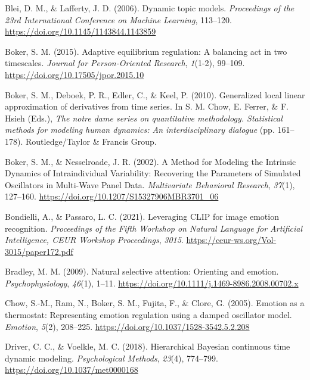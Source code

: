 \documentclass[
]{article}
\newlength{\cslhangindent}
\newenvironment{CSLReferences}[2] %
 {\begin{list}{}{%
  \setlength{\itemindent}{0pt}
  \setlength{\leftmargin}{0pt}
  \setlength{\parsep}{0pt}
  \ifodd #1
   \setlength{\leftmargin}{\cslhangindent}
   \setlength{\itemindent}{-1\cslhangindent}
  \fi
  \setlength{\itemsep}{#2\baselineskip}}}
 {\end{list}}
\begin{document}
\label{refs}
\begin{CSLReferences}{1}{0}
Blei, D. M., \& Lafferty, J. D. (2006). Dynamic topic models.
\emph{Proceedings of the 23rd International Conference on Machine
Learning}, 113--120. \url{https://doi.org/10.1145/1143844.1143859}

Boker, S. M. (2015). Adaptive equilibrium regulation: {A} balancing act
in two timescales. \emph{Journal for Person-Oriented Research},
\emph{1}(1-2), 99--109. \url{https://doi.org/10.17505/jpor.2015.10}

Boker, S. M., Deboek, P. R., Edler, C., \& Keel, P. (2010). Generalized
local linear approximation of derivatives from time series. In S. M.
Chow, E. Ferrer, \& F. Hsieh (Eds.), \emph{The notre dame series on
quantitative methodology. Statistical methods for modeling human
dynamics: An interdisciplinary dialogue} (pp. 161--178).
Routledge/Taylor \& Francis Group.

Boker, S. M., \& Nesselroade, J. R. (2002). A {Method} for {Modeling}
the {Intrinsic Dynamics} of {Intraindividual Variability}: {Recovering}
the {Parameters} of {Simulated Oscillators} in {Multi-Wave Panel Data}.
\emph{Multivariate Behavioral Research}, \emph{37}(1), 127--160.
\url{https://doi.org/10.1207/S15327906MBR3701_06}

Bondielli, A., \& Passaro, L. C. (2021). Leveraging {CLIP} for image
emotion recognition. \emph{Proceedings of the Fifth Workshop on Natural
Language for Artificial Intelligence, CEUR Workshop Proceedings},
\emph{3015}. \url{https://ceur-ws.org/Vol-3015/paper172.pdf}

Bradley, M. M. (2009). Natural selective attention: Orienting and
emotion. \emph{Psychophysiology}, \emph{46}(1), 1--11.
\url{https://doi.org/10.1111/j.1469-8986.2008.00702.x}

Chow, S.-M., Ram, N., Boker, S. M., Fujita, F., \& Clore, G. (2005).
Emotion as a thermostat: Representing emotion regulation using a damped
oscillator model. \emph{Emotion}, \emph{5}(2), 208--225.
\url{https://doi.org/10.1037/1528-3542.5.2.208}

Driver, C. C., \& Voelkle, M. C. (2018). Hierarchical {Bayesian}
continuous time dynamic modeling. \emph{Psychological Methods},
\emph{23}(4), 774--799. \url{https://doi.org/10.1037/met0000168}


\end{CSLReferences}
\end{document}
